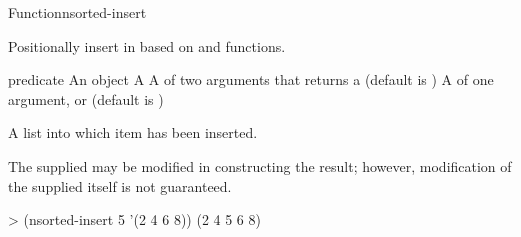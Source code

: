 \documentclass[10pt,twoside,english,pdftex]{article}
\begin{document}
\begin{functiondoc}{Function}{nsorted-insert}{
      
    \returns{} } 
%
%
  
\fnsyntax

\fnpurpose Positionally insert  in  based on
 and  functions.

\fnpackage {}

\fnmodule {}

\fnargs
\begin{args}{predicate}
\arg[item] An object
\arg[list] A 
\arg[predicate] A  of two arguments that returns a
 (default is )
\arg[key] A  of one argument, or \nil{} (default is \nil)
\end{args}

\fnreturns A list into which item has been inserted.

\fndescription The supplied  may be modified in
constructing the result; however, modification of the supplied
 itself is not guaranteed.

\fnexample
%
\W\supp
\begin{example}
> (nsorted-insert 5 '(2 4 6 8))
(2 4 5 6 8)
\end{example}

\end{functiondoc}

\end{document}
